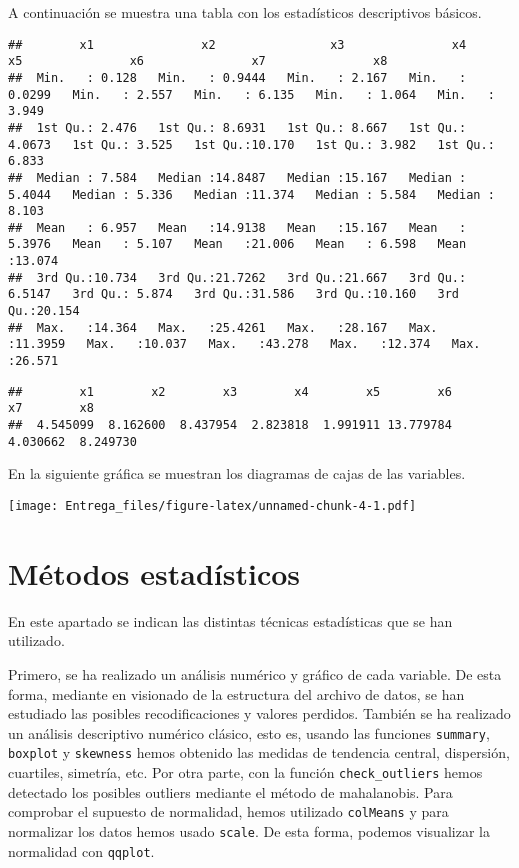 \documentclass[
]{scrreprt}
\begin{document}
A continuación se muestra una tabla con los estadísticos descriptivos
básicos.

\begin{verbatim}
##        x1               x2                x3               x4                x5               x6               x7               x8        
##  Min.   : 0.128   Min.   : 0.9444   Min.   : 2.167   Min.   : 0.0299   Min.   : 2.557   Min.   : 6.135   Min.   : 1.064   Min.   : 3.949  
##  1st Qu.: 2.476   1st Qu.: 8.6931   1st Qu.: 8.667   1st Qu.: 4.0673   1st Qu.: 3.525   1st Qu.:10.170   1st Qu.: 3.982   1st Qu.: 6.833  
##  Median : 7.584   Median :14.8487   Median :15.167   Median : 5.4044   Median : 5.336   Median :11.374   Median : 5.584   Median : 8.103  
##  Mean   : 6.957   Mean   :14.9138   Mean   :15.167   Mean   : 5.3976   Mean   : 5.107   Mean   :21.006   Mean   : 6.598   Mean   :13.074  
##  3rd Qu.:10.734   3rd Qu.:21.7262   3rd Qu.:21.667   3rd Qu.: 6.5147   3rd Qu.: 5.874   3rd Qu.:31.586   3rd Qu.:10.160   3rd Qu.:20.154  
##  Max.   :14.364   Max.   :25.4261   Max.   :28.167   Max.   :11.3959   Max.   :10.037   Max.   :43.278   Max.   :12.374   Max.   :26.571
\end{verbatim}

\begin{verbatim}
##        x1        x2        x3        x4        x5        x6        x7        x8 
##  4.545099  8.162600  8.437954  2.823818  1.991911 13.779784  4.030662  8.249730
\end{verbatim}

En la siguiente gráfica se muestran los diagramas de cajas de las
variables.

\texttt{[image: Entrega\_files/figure-latex/unnamed-chunk-4-1.pdf]}

\hypertarget{muxe9todos-estaduxedsticos}{%
\section{Métodos estadísticos}\label{muxe9todos-estaduxedsticos}}

En este apartado se indican las distintas técnicas estadísticas que se
han utilizado.

Primero, se ha realizado un análisis numérico y gráfico de cada
variable. De esta forma, mediante en visionado de la estructura del
archivo de datos, se han estudiado las posibles recodificaciones y
valores perdidos. También se ha realizado un análisis descriptivo
numérico clásico, esto es, usando las funciones \texttt{summary},
\texttt{boxplot} y \texttt{skewness} hemos obtenido las medidas de
tendencia central, dispersión, cuartiles, simetría, etc. Por otra parte,
con la función \texttt{check\_outliers} hemos detectado los posibles
outliers mediante el método de mahalanobis. Para comprobar el supuesto
de normalidad, hemos utilizado \texttt{colMeans} y para normalizar los
datos hemos usado \texttt{scale}. De esta forma, podemos visualizar la
normalidad con \texttt{qqplot}.
\end{document}
